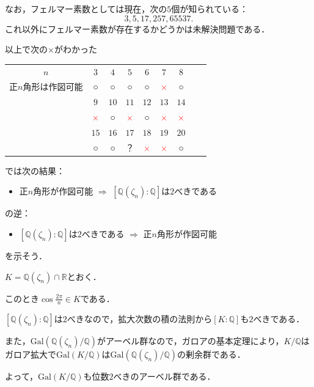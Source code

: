 \documentclass[dvipdfmx,17pt]{beamer}
\theoremstyle{plain}
\newcommand{\Q}{\mathbb{Q}}
\newcommand{\R}{\mathbb{R}}
\begin{document}
\begin{frame}
なお，フェルマー素数としては現在，次の$5$個が知られている：
\[3, 5, 17, 257, 65537.\]
これ以外にフェルマー素数が存在するかどうかは未解決問題である．
\end{frame}

\begin{frame}
以上で次の×がわかった
\small
\begin{table}[h]
  \begin{tabular}{ccccccccc}
    $n$ & $3$ & $4$ & $5$ & $6$ & $7$ & $8$ \\
    正$n$角形は作図可能 & ○ & ○ & ○ & ○ & \textcolor{red}{×} & ○ \\
     & $9$ & $10$ & $11$ & $12$ & $13$ & $14$ \\
     & \textcolor{red}{×} & ○ & \textcolor{red}{×} & ○ & \textcolor{red}{×} & \textcolor{red}{×} \\
     & $15$ & $16$ & $17$ & $18$ & $19$ & $20$ \\
     & ○ & ○ & ？ & \textcolor{red}{×} & \textcolor{red}{×} & ○
  \end{tabular}
\end{table}
\end{frame}



\begin{frame}
では次の結果：
\begin{itemize}
\item 正$n$角形が作図可能 $\Rightarrow$ $[\Q(\zeta_n) : \Q]$は$2$べきである
\end{itemize}
の逆：
\begin{itemize}
\item $[\Q(\zeta_n) : \Q]$は$2$べきである $\Rightarrow$ 正$n$角形が作図可能
\end{itemize}
を示そう．
\end{frame}

\begin{frame}
$K = \Q(\zeta_n) \cap \R$とおく．

このとき$\cos \frac{2 \pi}{n} \in K$である．

$[\Q(\zeta_n) : \Q]$は$2$べきなので，拡大次数の積の法則から$[K : \Q]$も$2$べきである．

また，$\mathrm{Gal}(\Q(\zeta_n)/\Q)$がアーベル群なので，ガロアの基本定理により，$K/\Q$はガロア拡大で$\mathrm{Gal}(K/\Q)$は$\mathrm{Gal}(\Q(\zeta_n)/\Q)$の剰余群である．

よって，$\mathrm{Gal}(K/\Q)$も位数$2$べきのアーベル群である．
\end{frame}
\end{document}
